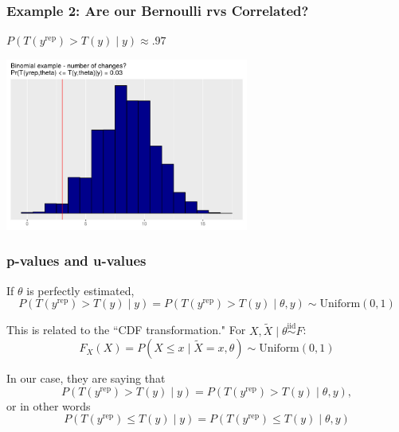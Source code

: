 \documentclass{beamer}
\begin{document}
\begin{frame}[fragile]
\frametitle{Example 2: Are our Bernoulli rvs Correlated?}

$P(T(y^{\text{rep} } ) > T(y ) \mid y) \approx .97$

\begin{center}
\includegraphics[width=80mm]{switches_hist.png}
\end{center}


\end{frame}

\begin{frame}[fragile]
\frametitle{p-values and u-values}

If $\theta$ is perfectly estimated, 
$$
P(T(y^{\text{rep} } ) > T(y ) \mid y) = P(T(y^{\text{rep} } ) > T(y ) \mid \theta, y) \sim \text{Uniform}(0,1)
$$
\newline

This is related to the ``CDF transformation." For $X, \tilde{X} \mid \theta \overset{\text{iid}}{\sim} F$: 
$$
F_X(X) = P(X \le x \mid \tilde{X} = x, \theta) \sim \text{Uniform}(0,1)
$$


In our case, they are saying that 
$$
P(T(y^{\text{rep}}) > T(y) \mid y) = P(T(y^{\text{rep}}) > T(y) \mid \theta, y),
$$
or in other words
$$
P(T(y^{\text{rep}}) \le T(y) \mid y) = P(T(y^{\text{rep}}) \le T(y) \mid \theta, y) 
$$


\end{frame}
\end{document}
